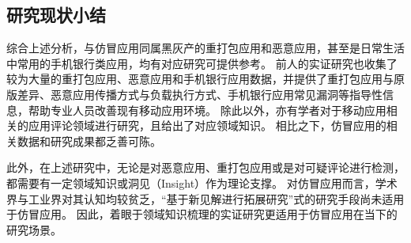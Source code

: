\subsection{研究现状小结}
综合上述分析，与仿冒应用同属黑灰产的重打包应用和恶意应用，甚至是日常生活中常用的手机银行类应用，均有对应研究可提供参考。
前人的实证研究也收集了较为大量的重打包应用、恶意应用和手机银行应用数据，并提供了重打包应用与原版差异、恶意应用传播方式与负载执行方式、手机银行应用常见漏洞等指导性信息，帮助专业人员改善现有移动应用环境。
除此以外，亦有学者对于移动应用相关的应用评论领域进行研究，且给出了对应领域知识。
相比之下，仿冒应用的相关数据和研究成果都乏善可陈。

此外，在上述研究中，无论是对恶意应用、重打包应用或是对可疑评论进行检测，都需要有一定领域知识或洞见（Insight）作为理论支撑。
对仿冒应用而言，学术界与工业界对其认知均较贫乏，``基于新见解进行拓展研究''式的研究手段尚未适用于仿冒应用。
因此，着眼于领域知识梳理的实证研究更适用于仿冒应用在当下的研究场景。
%
%
%

